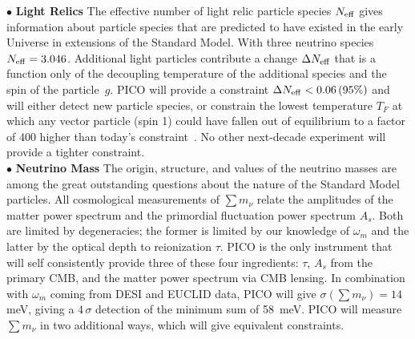 \documentclass[PICOAPC.tex]{subfiles}
\begin{document}
$\bullet$ {\bf Light Relics} \hspace{0.1in} The effective number of light relic particle species ${N_{\rm eff}}$ gives information about particle species that are predicted to have existed in the early Universe in extensions of the Standard Model. With three neutrino species ${N_{\rm eff}} = 3.046$. Additional light particles contribute a change $\Delta {N_{\rm eff}}$ that is a function only of the decoupling temperature of the additional species and the spin of the particle~$g$. PICO will provide a constraint $\Delta {N_{\rm eff}} < 0.06 \, (95\%)$ and will either detect new particle species, or constrain the lowest temperature $T_{F}$ at which any vector particle (spin 1) could have fallen out of equilibrium to a factor of 400 higher than today's constraint~\citep{greenswp}. No other next-decade experiment will provide a tighter constraint.   \\ %
\noindent$\bullet$ {\bf Neutrino Mass} \hspace{0.1in} \label{neutrino_fundamental} The origin, structure, and values of the neutrino masses are among the great outstanding  questions about the nature of the Standard Model particles.  
All cosmological measurements of $\sum m_\nu$ relate the amplitudes of the matter power spectrum and the primordial fluctuation power spectrum $A_s$.  Both are limited by degeneracies; the former is limited by our knowledge of $\omega_m$ and the latter by the optical depth to reionization $\tau$. PICO is the only instrument that will self consistently provide three of these four ingredients: $\tau$, $A_s$ from the primary CMB, and the matter power spectrum via CMB lensing. In combination with $\omega_m$ coming from DESI and EUCLID data, PICO will give $\sigma(\sum m_\nu) = 14$ meV, giving a $4\,\sigma$ detection of the minimum sum of 58~meV.
PICO will measure  $\sum m_\nu$ in two additional ways, which will give equivalent constraints. 

\end{document}
